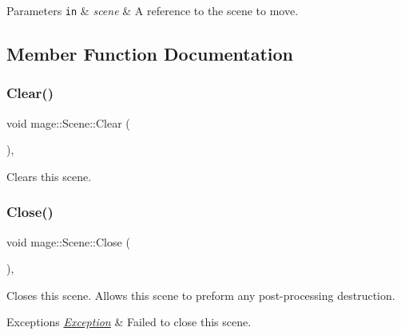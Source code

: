 \begin{DoxyParams}[1]{Parameters}
\mbox{\tt in}  & {\em scene} & A reference to the scene to move. \\
\hline
\end{DoxyParams}


\subsection{Member Function Documentation}
\hypertarget{classmage_1_1_scene_adf4a5b3885e34336caa5f145f55e01e1}{}\label{classmage_1_1_scene_adf4a5b3885e34336caa5f145f55e01e1} 
\subsubsection{\texorpdfstring{Clear()}{Clear()}}
{\footnotesize\ttfamily void mage\+::\+Scene\+::\+Clear (\begin{DoxyParamCaption}{ }\end{DoxyParamCaption})\hspace{0.3cm}{\ttfamily [private]}, {\ttfamily [noexcept]}}

Clears this scene. \hypertarget{classmage_1_1_scene_afcdedaac5ecab7dcbbb180426054aaa5}{}\label{classmage_1_1_scene_afcdedaac5ecab7dcbbb180426054aaa5} 
\subsubsection{\texorpdfstring{Close()}{Close()}}
{\footnotesize\ttfamily void mage\+::\+Scene\+::\+Close (\begin{DoxyParamCaption}{ }\end{DoxyParamCaption})\hspace{0.3cm}{\ttfamily [private]}, {\ttfamily [virtual]}}

Closes this scene. Allows this scene to preform any post-\/processing destruction.


\begin{DoxyExceptions}{Exceptions}
{\em \hyperlink{classmage_1_1_exception}{Exception}} & Failed to close this scene. \\
\hline
\end{DoxyExceptions}
\hypertarget{classmage_1_1_scene_a8ce3f5152ad4b0935a08cc2f0a53383c}{}\label{classmage_1_1_scene_a8ce3f5152ad4b0935a08cc2f0a53383c} 
